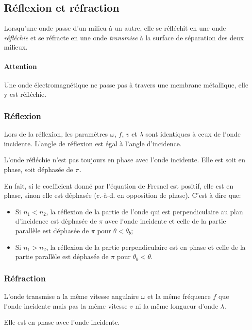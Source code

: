 \subsection{Réflexion et réfraction}
Lorsqu'une onde passe d'un milieu à un autre,
elle se réfléchit en une onde \emph{réfléchie} et se réfracte en une onde
\emph{transmise} à la surface de séparation des deux milieux.

\paragraph{Attention}
Une onde électromagnétique ne passe pas à travers une membrane métallique,
elle y est réfléchie.

\subsubsection{Réflexion}

Lors de la réflexion, les paramètres $\omega$, $f$, $v$ et $\lambda$
sont identiques à ceux de l'onde incidente.
L'angle de réflexion est égal à l'angle d'incidence.

L'onde réfléchie n'est pas toujours en phase avec l'onde incidente.
Elle est soit en phase, soit déphasée de $\pi$.

En fait, si le coefficient donné par l'équation de Fresnel est positif,
elle est en phase, sinon elle est déphasée (c.-à-d. en opposition de phase).
C'est à dire que:
\begin{itemize}
  \item Si $n_1 < n_2$, la réflexion de la partie de l'onde
    qui est perpendiculaire au plan
    d'incidence est déphasée de $\pi$ avec l'onde incidente
    et celle de la partie parallèle est déphasée de $\pi$
    pour $\theta < \theta_b$;
  \item Si $n_1 > n_2$, la réflexion de la partie perpendiculaire est
    en phase et celle de la partie parallèle est déphasée de $\pi$
    pour $\theta_b < \theta$.
\end{itemize}

\subsubsection{Réfraction}
L'onde transmise a la même vitesse angulaire $\omega$
et la même fréquence $f$ que l'onde incidente
mais pas la même vitesse $v$ ni la même longueur d'onde $\lambda$.

Elle est en phase avec l'onde incidente.

